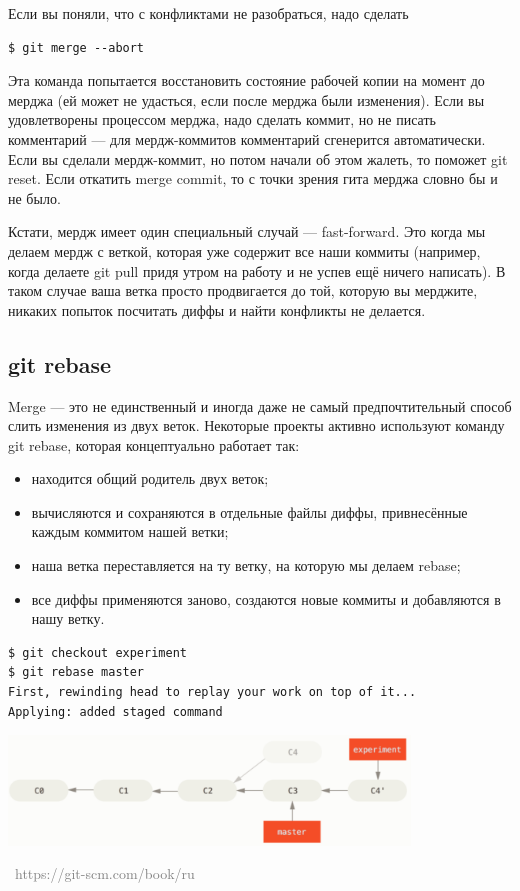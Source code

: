 \documentclass[a5paper]{article}
\newcommand{\attribution}[1] {
\vspace{-5mm}\begin{flushright}\begin{scriptsize}\textcolor{gray}{\textcopyright\, #1}\end{scriptsize}\end{flushright}
}
\begin{document}
Если вы поняли, что с конфликтами не разобраться, надо сделать 

\begin{verbatim}
$ git merge --abort
\end{verbatim}

Эта команда попытается восстановить состояние рабочей копии на момент до мерджа (ей может не удасться, если после мерджа были изменения). Если вы удовлетворены процессом мерджа, надо сделать коммит, но не писать комментарий --- для мердж-коммитов комментарий сгенерится автоматически. Если вы сделали мердж-коммит, но потом начали об этом жалеть, то поможет git reset. Если откатить merge commit, то с точки зрения гита мерджа словно бы и не было.

Кстати, мердж имеет один специальный случай --- fast-forward. Это когда мы делаем мердж с веткой, которая уже содержит все наши коммиты (например, когда делаете git pull придя утром на работу и не успев ещё ничего написать). В таком случае ваша ветка просто продвигается до той, которую вы мерджите, никаких попыток посчитать диффы и найти конфликты не делается.

\subsection{git rebase}

Merge --- это не единственный и иногда даже не самый предпочтительный способ слить изменения из двух веток. Некоторые проекты активно используют команду git rebase, которая концептуально работает так:

\begin{itemize}
	\item находится общий родитель двух веток;
	\item вычисляются и сохраняются в отдельные файлы диффы, привнесённые каждым коммитом нашей ветки;
	\item наша ветка переставляется на ту ветку, на которую мы делаем rebase;
	\item все диффы применяются заново, создаются новые коммиты и добавляются в нашу ветку.
\end{itemize}

\begin{verbatim}
$ git checkout experiment
$ git rebase master
First, rewinding head to replay your work on top of it...
Applying: added staged command
\end{verbatim}

\begin{center}
	\includegraphics[width=0.8\textwidth]{rebase.png}
	\attribution{https://git-scm.com/book/ru}
\end{center}
\end{document}
